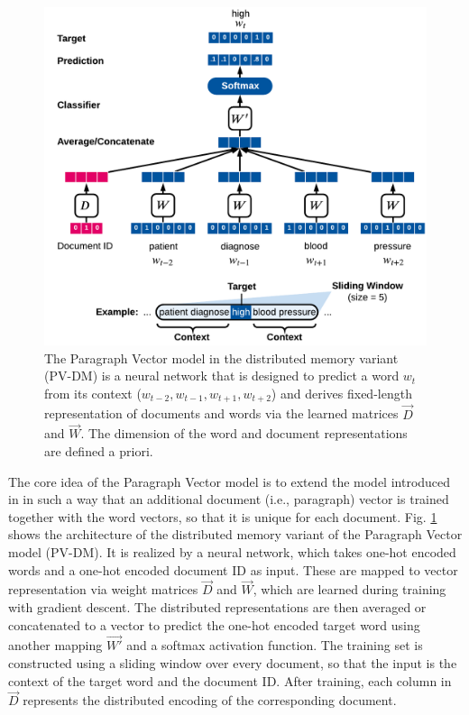 \begin{figure}[!htbp]
	\centering
	\includegraphics[width=\textwidth]{figures/paragraph-vector}
	\caption[Paragraph Vector model]{The Paragraph Vector model in the distributed memory variant (PV-DM) is a neural network that is designed to predict a word $w_t$ from its context ($w_{t-2}, w_{t-1}, w_{t+1}, w_{t+2}$) and derives fixed-length representation of documents and words via the learned matrices $\vec{D}$ and $\vec{W}$. The dimension of the word and document representations are defined a priori.}
	\label{fig:paragraph-vector}
\end{figure}

The core idea of the Paragraph Vector model is to extend the model introduced in \cite{DBLP:journals/jmlr/BengioDVJ03} in such a way that an additional document (i.e., paragraph) vector is trained together with the word vectors, so that it is unique for each document.
Fig. \ref{fig:paragraph-vector} shows the architecture of the distributed memory variant of the Paragraph Vector model (PV-DM).
It is realized by a neural network, which takes one-hot encoded words and a one-hot encoded document ID as input.
These are mapped to vector representation via weight matrices $\vec{D}$ and $\vec{W}$, which are learned during training with gradient descent.
The distributed representations are then averaged or concatenated to a vector to predict the one-hot encoded target word using another mapping $\vec{W'}$ and a softmax activation function.
The training set is constructed using a sliding window over every document, so that the input is the context of the target word and the document ID.
After training, each column in $\vec{D}$ represents the distributed encoding of the corresponding document.

